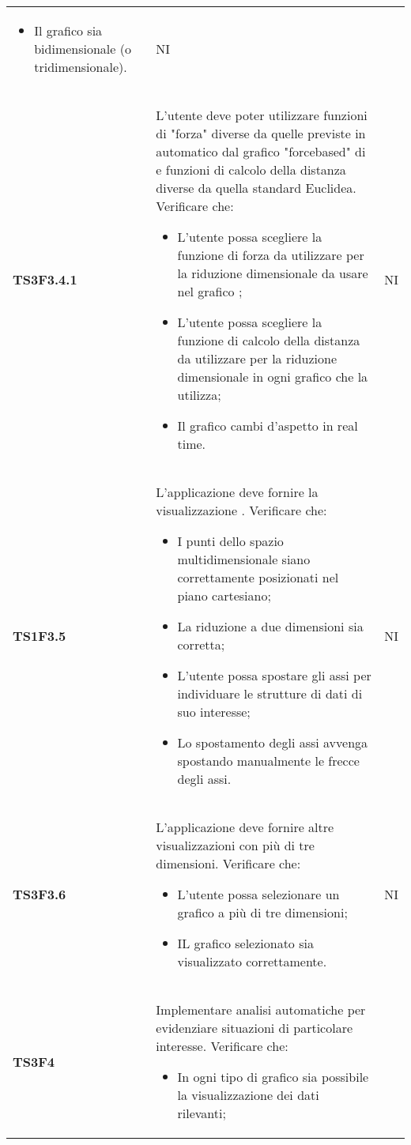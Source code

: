 \begin{longtable}{C{2cm} C{12cm} C{1.5cm}}
\begin{itemize}
						\item Il grafico sia bidimensionale (o tridimensionale).
					\end{itemize}	
				 & NI \\
\textbf{TS3F3.4.1} & L'utente deve poter utilizzare funzioni di "forza" diverse da quelle previste in automatico dal grafico "forcebased" di  e funzioni di calcolo della distanza diverse da quella standard Euclidea. Verificare che:
					\begin{itemize}
						\item L'utente possa scegliere la funzione di forza da utilizzare per la riduzione dimensionale da usare nel grafico ;
						\item L'utente possa scegliere la funzione di calcolo della distanza da utilizzare per la riduzione dimensionale in ogni grafico che la utilizza;
						\item Il grafico cambi d'aspetto in real time.
					\end{itemize}
				   & NI \\
\textbf{TS1F3.5} & L'applicazione deve fornire la visualizzazione . Verificare che:
					\begin{itemize}
						\item I punti dello spazio multidimensionale siano correttamente posizionati nel piano cartesiano;
						\item La riduzione a due dimensioni sia corretta;
						\item L'utente possa spostare gli assi per individuare le strutture di dati di suo interesse;
						\item Lo spostamento degli assi avvenga spostando manualmente le frecce degli assi.
					\end{itemize}	
				   & NI \\
\textbf{TS3F3.6} & L'applicazione deve fornire altre visualizzazioni con più di tre dimensioni. Verificare che:
					\begin{itemize}
						\item L'utente possa selezionare un grafico a più di tre dimensioni;
						\item IL grafico selezionato sia visualizzato correttamente.
					\end{itemize}	
				   & NI \\
\textbf{TS3F4} & Implementare analisi automatiche per evidenziare situazioni di particolare interesse. Verificare che: 
					\begin{itemize}
						\item In ogni tipo di grafico sia possibile la visualizzazione dei dati rilevanti;

\end{itemize}
\end{longtable}
